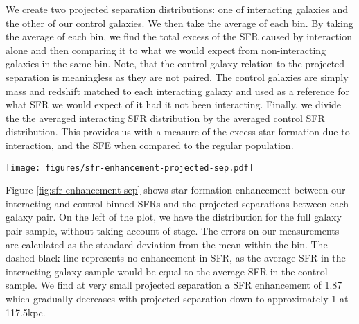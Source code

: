 \documentclass[fleqn,usenatbib]{mnras}
\begin{document}
We create two projected separation distributions: one of interacting galaxies and the other of our control galaxies. We then take the average of each bin. By taking the average of each bin, we find the total excess of the SFR caused by interaction alone and then comparing it to what we would expect from non-interacting galaxies in the same bin. Note, that the control galaxy relation to the projected separation is meaningless as they are not paired. The control galaxies are simply mass and redshift matched to each interacting galaxy and used as a reference for what SFR we would expect of it had it not been interacting. Finally, we divide the the averaged interacting SFR distribution by the averaged control SFR distribution. This provides us with a measure of the excess star formation due to interaction, and the SFE when compared to the regular population.

\begin{figure*}
    \centering
    \texttt{[image: figures/sfr-enhancement-projected-sep.pdf]}
    \caption{The projected separation against the star formation enhancement in average star formation at different bins of projected separation. Each bin must contain at least 10 counts to be considered. As the bulk of our galaxy pair sample is at low projected separation, we heavily sample from this region of the parameter space. The bins are: [0.5, 10, 20, 50, 100, 125] kpc. As we move to higher projected separation, the bins increase in width to maintain statistical significance in our sample. \textit{Left}: The star formation enhancement found in the entire galaxy pair sample. As expected, we see a gradually decreasing enhancement. \textit{Right}: As left but broken up into different stages of the interaction. Black markers are stage 1, red stage 2 and blue stage 3. We only investigate stages 1,2 and 3 as only three galaxy pairs were identified in stage 4. Here, we find a generally decreasing star formation enhancement with projected separation but very different individual behaviour dependent on the stage classification.}
    \label{fig:sfr-enhancement-sep}
\end{figure*}

Figure \ref{fig:sfr-enhancement-sep} shows star formation enhancement between our interacting and control binned SFRs and the projected separations between each galaxy pair. On the left of the plot, we have the distribution for the full galaxy pair sample, without taking account of stage. The errors on our measurements are calculated as the standard deviation from the mean within the bin. The dashed black line represents no enhancement in SFR, as the average SFR in the interacting galaxy sample would be equal to the average SFR in the control sample. We find at very small projected separation a SFR enhancement of 1.87 which gradually decreases with projected separation down to approximately 1 at 117.5kpc. 
\end{document}
